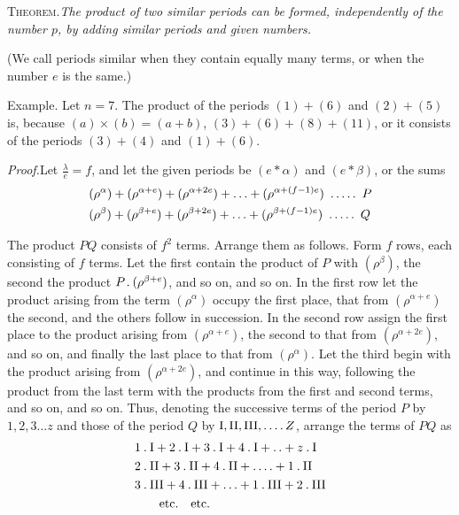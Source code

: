 \textsc{Theorem.}\quad\emph{The product of two similar periods can be formed, independently of the number $p$, by adding similar periods and given numbers.}

(We call periods similar when they contain equally many terms, or when the number $e$ is the same.)

Example. Let $n=7$. The product of the periods $(1)+(6)$ and $(2)+(5)$ is, because $(a)\times(b)=(a+b)$, $(3)+(6)+(8)+(11)$, or it consists of the periods $(3)+(4)$ and $(1)+(6)$.

\emph{Proof.}\quad Let $\frac{\lambda}{e}=f$, and let the given periods be $(e\ast\alpha)$ and $(e\ast\beta)$, or the sums
\[
\begin{aligned}
&(\rho^\alpha)+(\rho^{\alpha+e})+(\rho^{\alpha+2e})+\ldots+(\rho^{\alpha+(f-1)e})\ \dotsfive\ P\\
&(\rho^\beta)+(\rho^{\beta+e})+(\rho^{\beta+2e})+\ldots+(\rho^{\beta+(f-1)e})\ \dotsfive\ Q
\end{aligned}
\]

The product $PQ$ consists of $f^2$ terms. Arrange them as follows. Form $f$ rows, each consisting of $f$ terms. Let the first contain the product of $P$ with $(\rho^\beta)$, the second the product $P\mathbin{.}(\rho^{\beta+e})$, and so on, and so on. In the first row let the product arising from the term $(\rho^\alpha)$ occupy the first place, that from $(\rho^{\alpha+e})$ the second, and the others follow in succession. In the second row assign the first place to the product arising from $(\rho^{\alpha+e})$, the second to that from $(\rho^{\alpha+2e})$, and so on, and finally the last place to that from $(\rho^\alpha)$. Let the third begin with the product arising from $(\rho^{\alpha+2e})$, and continue in this way, following the product from the last term with the products from the first and second terms, and so on, and so on. Thus, denoting the successive terms of the period $P$ by $1,2,3\ldots z$ and those of the period $Q$ by $\mathrm{I},\mathrm{II},\mathrm{III},\mathinner{.\,.\,.\,.} Z$, arrange the terms of $PQ$ as
\[
\begin{aligned}
&1\mathbin{.}\mathrm{I}+2\mathbin{.}\mathrm{I}+3\mathbin{.}\mathrm{I}+4\mathbin{.}\mathrm{I}+\mathinner{.\,.}+z\mathbin{.}\mathrm{I}\\
&2\mathbin{.}\mathrm{II}+3\mathbin{.}\mathrm{II}+4\mathbin{.}\mathrm{II}+\mathinner{.\,.\,.\,.}+1\mathbin{.}\mathrm{II}\\
&3\mathbin{.}\mathrm{III}+4\mathbin{.}\mathrm{III}+\ldots+1\mathbin{.}\mathrm{III}+2\mathbin{.}\mathrm{III}\\
&\qquad\text{etc.}\quad\text{etc.}
\end{aligned}
\]

